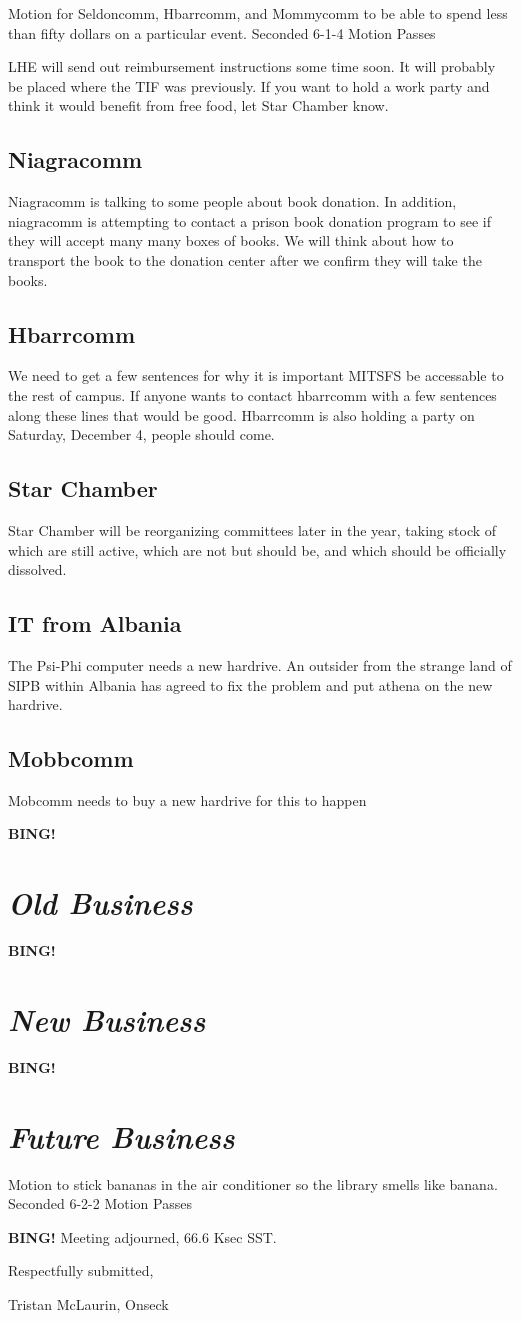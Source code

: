 \documentclass[10pt]{article}
\newcommand{\bing}{{\bf BING!} }
\newcommand{\goto}[1]{\bing \vskip 12pt \section*{{\em{#1}}}}
\newcommand{\onseck}{Tristan McLaurin, Onseck}
\begin{document}
Motion for  Seldoncomm, Hbarrcomm, and Mommycomm  to be able to spend less than fifty dollars on a particular event.
Seconded
6-1-4
Motion Passes

LHE will send out reimbursement instructions some time soon. It will probably be placed where the TIF was previously. If you want to hold a work party and think it would benefit from free food, let Star Chamber know.

\subsection*{Niagracomm}
Niagracomm is talking to some people about book donation. In addition, niagracomm is attempting to contact a prison book donation program to see if they will accept many many boxes of books. We will think about how to transport the book to the donation center after we confirm they will take the books.

\subsection*{Hbarrcomm}
We need to get   a few sentences for why it is important MITSFS be accessable to the rest of campus.  If anyone wants to contact hbarrcomm with a few sentences along these lines that would be good.
Hbarrcomm is also holding a party on Saturday, December 4, people should come.

\subsection*{Star Chamber}
Star Chamber will be reorganizing committees later in the year, taking stock of which are still active, which are not but should be, and which should be officially dissolved.

\subsection*{IT from Albania}
The Psi-Phi computer needs a new hardrive. An outsider from the strange land of SIPB within Albania has agreed to fix the problem and put athena on the new hardrive.

\subsection*{Mobbcomm}
Mobcomm needs to buy a new hardrive for this to happen

\goto{Old Business}

\goto{New Business}

\goto{Future Business}

Motion to stick bananas in the air conditioner so the library smells like banana.
Seconded
6-2-2
Motion Passes

\bing
\noindent
Meeting adjourned, 66.6 Ksec SST.

\vspace{18pt}

\centerline{Respectfully submitted,}
\centerline{\onseck}
\end{document}
